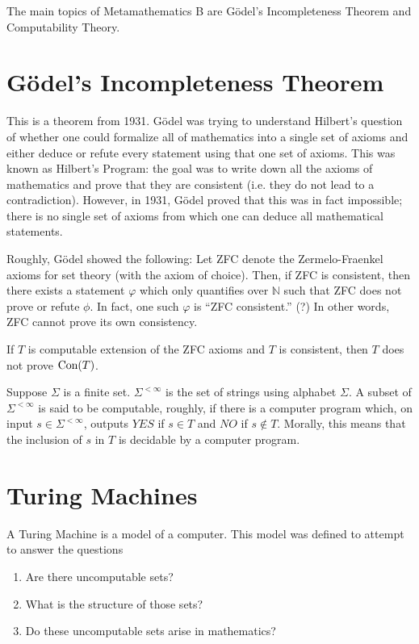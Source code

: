 The main topics of Metamathematics B are Gödel's Incompleteness Theorem and Computability Theory.

\section{Gödel's Incompleteness Theorem}
This is a theorem from 1931.
Gödel was trying to understand Hilbert's question of whether one could formalize all of mathematics into a single set of axioms and either deduce or refute every statement using that one set of axioms.
This was known as Hilbert's Program: the goal was to write down all the axioms of mathematics and prove that they are consistent (i.e. they do not lead to a contradiction).
However, in 1931, Gödel proved that this was in fact impossible;
there is no single set of axioms from which one can deduce all mathematical statements.

Roughly, Gödel showed the following:
Let ZFC denote the Zermelo-Fraenkel axioms for set theory (with the axiom of choice).
Then, if ZFC is consistent, then there exists a statement $\varphi$ which only quantifies over $\mathbb{N}$ such that ZFC does not prove or refute $\phi$.
In fact, one such $\varphi$ is ``ZFC consistent.'' (?)
In other words, ZFC cannot prove its own consistency.

If $T$ is computable extension of the ZFC axioms and $T$ is consistent, then $T$ does not prove $\text{Con}(T)$.

Suppose $\Sigma$ is a finite set.
$\Sigma^{< \infty}$ is the set of strings using alphabet $\Sigma$.
A subset of $\Sigma^{< \infty}$ is said to be computable, roughly, if
there is a computer program which, on input $s \in \Sigma^{< \infty}$, outputs $YES$ if $s \in T$ and $NO$ if $s \notin T$.
Morally, this means that the inclusion of $s$ in $T$ is decidable by a computer program.

\section{Turing Machines}
A Turing Machine is a model of a computer.
This model was defined to attempt to answer the questions
\begin{enumerate}
    \item Are there uncomputable sets?
    \item What is the structure of those sets?
    \item Do these uncomputable sets arise in mathematics?
\end{enumerate}

